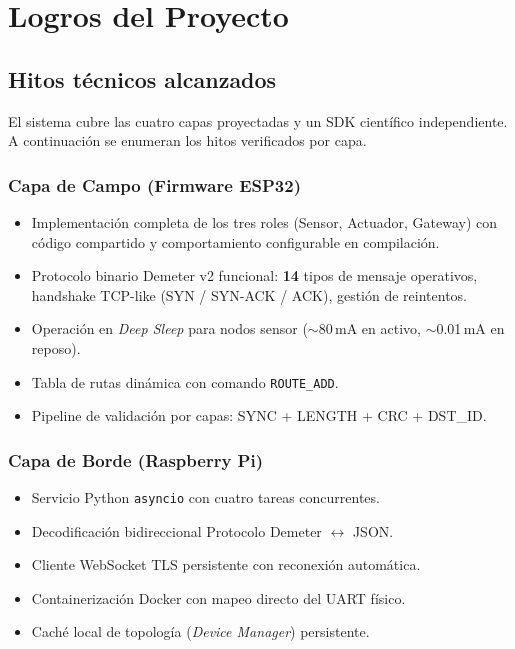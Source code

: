 \chapter{Logros del Proyecto}
\label{cap:logros}

\section{Hitos t\'ecnicos alcanzados}

El sistema cubre las cuatro capas proyectadas y un SDK cient\'ifico
independiente. A continuaci\'on se enumeran los hitos verificados por
capa.

\subsection{Capa de Campo (Firmware ESP32)}
\begin{itemize}[leftmargin=*]
    \item Implementaci\'on completa de los tres roles (Sensor, Actuador,
    Gateway) con c\'odigo compartido y comportamiento configurable en
    compilaci\'on.
    \item Protocolo binario Demeter v2 funcional: \textbf{14} tipos de
    mensaje operativos, handshake TCP-like (SYN / SYN-ACK / ACK),
    gesti\'on de reintentos.
    \item Operaci\'on en \textit{Deep Sleep} para nodos sensor
    ($\sim$80\,mA en activo, $\sim$0.01\,mA en reposo).
    \item Tabla de rutas din\'amica con comando \texttt{ROUTE\_ADD}.
    \item Pipeline de validaci\'on por capas: SYNC + LENGTH + CRC + DST\_ID.
\end{itemize}

\subsection{Capa de Borde (Raspberry Pi)}
\begin{itemize}[leftmargin=*]
    \item Servicio Python \texttt{asyncio} con cuatro tareas concurrentes.
    \item Decodificaci\'on bidireccional Protocolo Demeter $\leftrightarrow$ JSON.
    \item Cliente WebSocket TLS persistente con reconexi\'on autom\'atica.
    \item Containerizaci\'on Docker con mapeo directo del UART f\'isico.
    \item Cach\'e local de topolog\'ia (\textit{Device Manager}) persistente.
\end{itemize}

